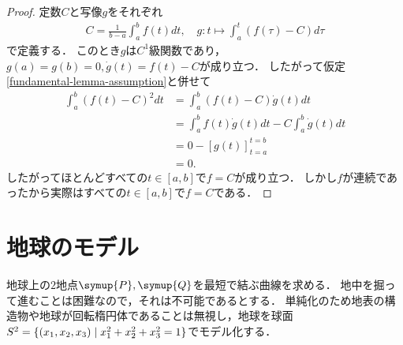 \documentclass{ltjsarticle}
\begin{document}
\begin{proof}
定数\(C\)と写像\(g\)をそれぞれ
\begin{gather*}
    C = \frac{1}{b - a} \int_a^b f(t) dt, \quad g \colon t \mapsto \int_a^t (f(\tau) - C) d\tau
\end{gather*}
で定義する．
このとき\(g\)は\(C^1\)級関数であり，\(g(a) = g(b) = 0, \dot{g}(t) = f(t) - C\)が成り立つ．
したがって仮定\ref{fundamental-lemma-assumption}と併せて
\begin{align*}
    \int_a^b (f(t) - C)^2 dt
    &= \int_a^b (f(t) - C) \dot{g}(t) dt \\
    &= \int_a^b f(t)\dot{g}(t) dt - C \int_a^b \dot{g}(t)dt \\
    &= 0 - [g(t)]_{t = a}^{t = b} \\
    &= 0.
\end{align*}
したがってほとんどすべての\(t \in [a, b]\)で\(f = C\)が成り立つ．
しかし\(f\)が連続であったから実際はすべての\(t \in [a, b]\)で\(f = C\)である．
\end{proof}

\section{地球のモデル}

地球上の\(2\)地点\(\symup{P}, \symup{Q}\)を最短で結ぶ曲線を求める．
地中を掘って進むことは困難なので，それは不可能であるとする．
単純化のため地表の構造物や地球が回転楕円体であることは無視し，地球を球面\(S^2 = \{(x_1, x_2, x_3) \mid x_1^2 + x_2^2 + x_3^2 = 1\}\)でモデル化する．
\end{document}
